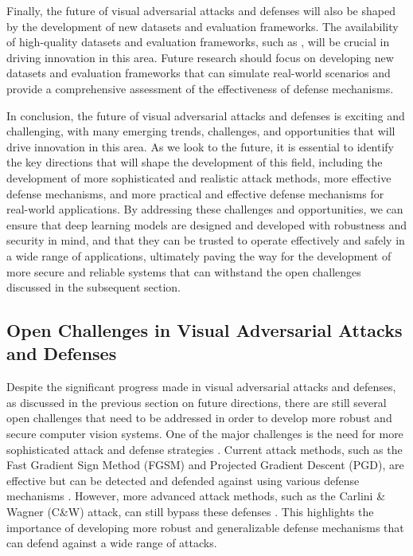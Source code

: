 \documentclass[11pt]{article}
\begin{document}
Finally, the future of visual adversarial attacks and defenses will also be shaped by the development of new datasets and evaluation frameworks. The availability of high-quality datasets and evaluation frameworks, such as \cite{ref90}, will be crucial in driving innovation in this area. Future research should focus on developing new datasets and evaluation frameworks that can simulate real-world scenarios and provide a comprehensive assessment of the effectiveness of defense mechanisms.

In conclusion, the future of visual adversarial attacks and defenses is exciting and challenging, with many emerging trends, challenges, and opportunities that will drive innovation in this area. As we look to the future, it is essential to identify the key directions that will shape the development of this field, including the development of more sophisticated and realistic attack methods, more effective defense mechanisms, and more practical and effective defense mechanisms for real-world applications. By addressing these challenges and opportunities, we can ensure that deep learning models are designed and developed with robustness and security in mind, and that they can be trusted to operate effectively and safely in a wide range of applications, ultimately paving the way for the development of more secure and reliable systems that can withstand the open challenges discussed in the subsequent section.

\subsection{Open Challenges in Visual Adversarial Attacks and Defenses}

Despite the significant progress made in visual adversarial attacks and defenses, as discussed in the previous section on future directions, there are still several open challenges that need to be addressed in order to develop more robust and secure computer vision systems. One of the major challenges is the need for more sophisticated attack and defense strategies \cite{ref34}. Current attack methods, such as the Fast Gradient Sign Method (FGSM) and Projected Gradient Descent (PGD), are effective but can be detected and defended against using various defense mechanisms \cite{ref6}. However, more advanced attack methods, such as the Carlini \& Wagner (C\&W) attack, can still bypass these defenses \cite{ref224}. This highlights the importance of developing more robust and generalizable defense mechanisms that can defend against a wide range of attacks.
\end{document}
